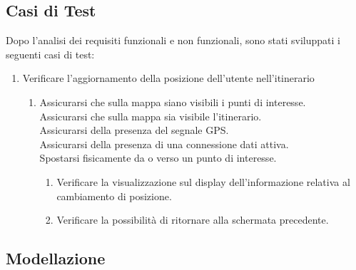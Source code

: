 \subsection{Casi di Test}
Dopo l'analisi dei requisiti funzionali e non funzionali, sono stati sviluppati i seguenti casi di test:
\begin{enumerate}
\item Verificare l'aggiornamento della posizione dell'utente nell'itinerario
\begin{enumerate}
\item Assicurarsi che sulla mappa siano visibili i punti di interesse.\\
 Assicurarsi che sulla mappa sia visibile l'itinerario.\\
Assicurarsi della presenza del segnale GPS.\\
Assicurarsi della presenza di una connessione dati attiva.\\
Spostarsi fisicamente da o verso un punto di interesse.\\
\begin{enumerate}
\item Verificare la visualizzazione sul display dell'informazione relativa al cambiamento di posizione.
\item Verificare la possibilità di ritornare alla schermata precedente.
\end{enumerate}
\end{enumerate}
\end{enumerate}

\subsection{Modellazione}
